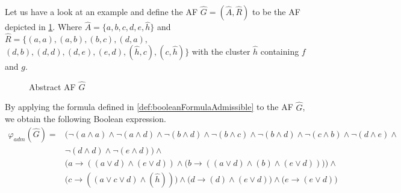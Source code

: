 \begin{example}
    Let us have a look at an example and define the AF $\hat{G}=(\hat{A},\hat{R})$ to be the AF depicted in \cref{af:algorithmEncodingsAdmissible}. Where $\hat{A}=\{a, b, c, d, e, \hat{h}\}$ and $\hat{R}=\big\{ (a,a), (a,b), (b,c), (d,a),$ $(d,b), (d,d), (d, e), (e, d), (\hat{h}, c), (c, \hat{h})\big\}$ with the cluster $\hat{h}$ containing $f$ and $g$.

    \begin{figure}[H]
        \centering
        \caption{Abstract AF $\hat{G}$}
        \label{af:algorithmEncodingsAdmissible}
    \end{figure}

By applying the formula defined in \cref{def:booleanFormulaAdmissible} to the AF $\hat{G}$, we obtain the following Boolean expression.
\begin{align*}
    \varphi_{adm}(\hat{G}) = &\big(
     \lnot (a \land a) \land \lnot (a \land d) \land \lnot (b \land d) \land \lnot (b \land c) \land \lnot (b \land d) \land \lnot (c \land b) \land \lnot (d \land e) \land \\
      & \lnot (d \land d) \land \lnot (e \land d) \big) \land\\
      &\bigl( a \rightarrow ((a \lor d) \land (e \lor d)) \land \bigl( b \rightarrow ((a \lor d) \land (b) \land (e \lor d)) \bigl) \bigl) \land\\
      &\bigl( c \rightarrow ((a \lor c \lor d) \land (\hat{h})) \bigl) \land \bigl( d \rightarrow (d) \land (e \lor d) \bigl) \land \bigl( e \rightarrow (e \lor d) \bigl)
\end{align*}


\end{example}
